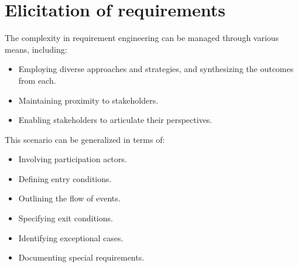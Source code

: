 \section{Elicitation of requirements}

The complexity in requirement engineering can be managed through various means, including:
\begin{itemize}
    \item Employing diverse approaches and strategies, and synthesizing the outcomes from each.
    \item Maintaining proximity to stakeholders.
    \item Enabling stakeholders to articulate their perspectives.
\end{itemize}
This scenario can be generalized in terms of:
\begin{itemize}
    \item Involving participation actors.
    \item Defining entry conditions.
    \item Outlining the flow of events.
    \item Specifying exit conditions.
    \item Identifying exceptional cases.
    \item Documenting special requirements.
\end{itemize}